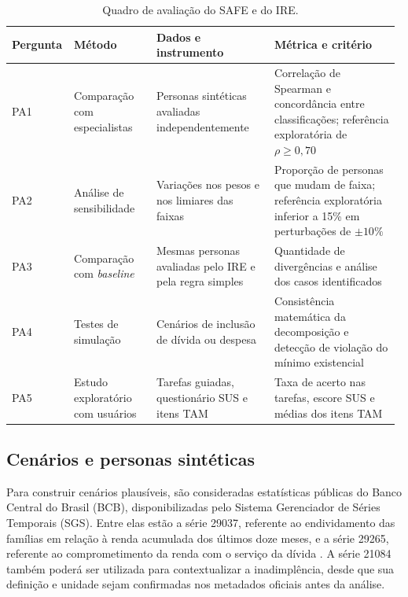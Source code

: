 \documentclass[portuguese]{sbc2025}%
\begin{document}
\begin{table}[htbp]
\centering
\small
\setlength{\tabcolsep}{3pt}
\renewcommand{\arraystretch}{1.25}
\caption{Quadro de avaliação do SAFE e do IRE.}
\label{tab:quadro-aval}
\begin{tabular}{@{}>{\centering\arraybackslash}p{0.15\linewidth}>{\centering\arraybackslash}p{0.21\linewidth}
>{\centering\arraybackslash}p{0.30\linewidth}
>{\centering\arraybackslash}p{0.32\linewidth}
@{}}
\toprule
\textbf{Pergunta} &
\textbf{Método} &
\textbf{Dados e instrumento} &
\textbf{Métrica e critério} \\
\midrule
PA1 &
Comparação com especialistas &
Personas sintéticas avaliadas independentemente &
Correlação de Spearman e concordância entre classificações; referência exploratória de $\rho \geq 0{,}70$ \\
\addlinespace
PA2 &
Análise de sensibilidade &
Variações nos pesos e nos limiares das faixas &
Proporção de personas que mudam de faixa; referência exploratória inferior a 15\% em perturbações de $\pm 10\%$ \\
\addlinespace
PA3 &
Comparação com \textit{baseline} &
Mesmas personas avaliadas pelo IRE e pela regra simples &
Quantidade de divergências e análise dos casos identificados \\
\addlinespace
PA4 &
Testes de simulação &
Cenários de inclusão de dívida ou despesa &
Consistência matemática da decomposição e detecção de violação do mínimo existencial \\
\addlinespace
PA5 &
Estudo exploratório com usuários &
Tarefas guiadas, questionário SUS e itens TAM &
Taxa de acerto nas tarefas, escore SUS e médias dos itens TAM \\
\bottomrule
\end{tabular}
\end{table}

\subsection{Cenários e personas sintéticas}
\label{sec:aval-personas}

Para construir cenários plausíveis, são consideradas estatísticas
públicas do Banco Central do Brasil (BCB), disponibilizadas pelo
Sistema Gerenciador de Séries Temporais (SGS). Entre elas estão a série
29037, referente ao endividamento das famílias em relação à renda
acumulada dos últimos doze meses, e a série 29265, referente ao
comprometimento da renda com o serviço da dívida
\citep{bcb29037,bcb29265}. A série 21084 também poderá ser utilizada
para contextualizar a inadimplência, desde que sua definição e unidade
sejam confirmadas nos metadados oficiais antes da análise.
\end{document}
